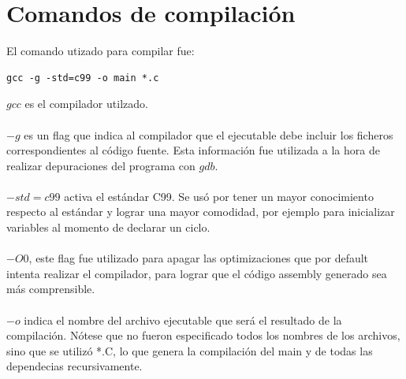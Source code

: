 \documentclass[11pt]{article}
\begin{document}
    \section*{Comandos de compilación}
        El comando utizado para compilar fue:
        \begin{verbatim}
gcc -g -std=c99 -o main *.c
        \end{verbatim}
        $gcc$ es el compilador utilzado.\\
        \\
        $-g$ es un flag que indica al compilador que el ejecutable debe incluir los ficheros correspondientes al código fuente. Esta información fue utilizada a la hora de realizar depuraciones del programa con $gdb$.\\
        \\
        $-std=c99$ activa el estándar C99. Se usó por tener un mayor conocimiento respecto al estándar y lograr una mayor comodidad, por ejemplo para inicializar variables al momento de declarar un ciclo.\\
        \\
        $-O0$, este flag fue utilizado para apagar las optimizaciones que por default intenta realizar el compilador, para lograr que el código assembly generado sea más comprensible.\\
        \\
        $-o$ indica el nombre del archivo ejecutable que será el resultado de la compilación. Nótese que no fueron especificado todos los nombres de los archivos, sino que se utilizó *.C, lo que genera la compilación del main y de todas las dependecias recursivamente. 
\end{document}
